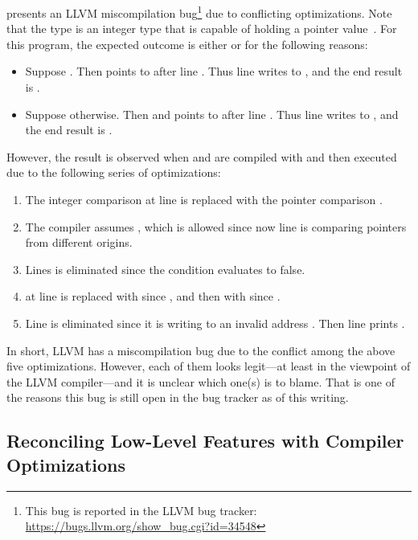  presents an LLVM miscompilation bug\footnote{This bug is reported in the
  LLVM bug tracker: \url{https://bugs.llvm.org/show_bug.cgi?id=34548}} due to conflicting
optimizations.  Note that the type  is an integer type that is capable of holding a
pointer value~\cite[\S7.20.1.4]{c18}.  For this program, the expected outcome is either  or  for the following reasons:
%
\begin{itemize}
\item Suppose .  Then  points to  after line .  Thus line
   writes  to , and the end result is .

\item Suppose otherwise.  Then  and  points to  after line .
  Thus line  writes  to , and the end result is .
\end{itemize}
%
However, the result  is observed when  and  are compiled with
 and then executed due to the following series of optimizations:
\begin{enumerate}
\item The integer comparison  at line  is replaced with the pointer
  comparison .
\item The compiler assumes , which is allowed since now line  is comparing
  pointers from different origins.
\item Lines  is eliminated since the condition  evaluates to false.
\item {} at line  is replaced with  since , and then
  with  since .
\item Line  is eliminated since it is writing to an invalid address .  Then line
   prints .
\end{enumerate}
%
\noindent In short, LLVM has a miscompilation bug due to the conflict among the above five
optimizations.  However, each of them looks legit---at least in the viewpoint of the LLVM
compiler---and it is unclear which one(s) is to blame.  That is one of the reasons this bug is still
open in the bug tracker as of this writing.


\subsection{Reconciling Low-Level Features with Compiler Optimizations}

